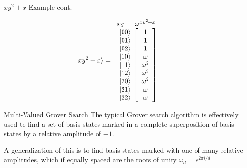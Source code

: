 \documentclass[xcolor=dvipsnames]{beamer}
\begin{document}
\begin{frame}{$xy^2+x$ Example cont.}        
        
        $$\hspace{-.8cm}\vert xy^2+x\rangle = \begin{array}{c c}  x y
          & \begin{array}{c} \omega^{xy^2+x} \\ \end{array} \\
          \begin{array}{c c c c c c c c c}\vert 00\rangle \\ \vert 01 \rangle\\
          \vert 02 \rangle \\ \vert 10\rangle \\ \vert 11\rangle\\ \vert 12\rangle\\
          \vert 20 \rangle \\ \vert 21 \rangle \\ \vert 22\rangle\end{array} \hspace{-.5cm}&
          \left[
          \begin{array}{c}
          1 \\
          1 \\
          1 \\
          \omega \\
          \omega^2 \\
          \omega^2\\
          \omega^2\\
          \omega \\
          \omega \\
          \end{array}
          \right]
          \end{array}
        $$

\end{frame}


\begin{frame}{Multi-Valued Grover Search}
The typical Grover search algorithm is effectively used to find a 
set of basis states marked in a complete superposition of basis states by a relative amplitude of $-1$.

\vspace{1.2cm}\pause

A generalization of this is to find basis states marked with one of many relative amplitudes, which if 
equally spaced are the roots of unity $\omega_d=e^{2\pi i/d}$

\end{frame}
\end{document}
